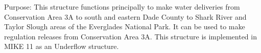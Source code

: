 Purpose:
This structure functions principally to make water deliveries from Conservation Area 3A to south and eastern Dade County to Shark River and Taylor Slough areas of the Everglades National Park. It can be used to make regulation releases from Conservation Area 3A. This structure is implemented in MIKE 11 as an Underflow structure.


